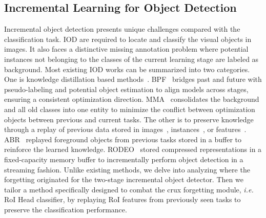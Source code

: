 \subsection{Incremental Learning for Object Detection}
Incremental object detection presents unique challenges compared with the classification task. 
IOD are required to locate and classify the visual objects in images. 
It also faces a distinctive missing annotation problem where potential instances not belonging to the classes of the current learning stage are labeled as background. 
Most existing IOD works can be summarized into two categories. 
One is knowledge distillation based methods~\cite{mo2024bridge, cermelli2022modeling}. BPF~\cite{mo2024bridge} bridges past and future with pseudo-labeling and potential object estimation to align models across stages, ensuring a consistent optimization direction. 
MMA~\cite{cermelli2022modeling} consolidates the background and all old classes into one entity to minimize the conflict between optimization objects between previous and current tasks. 
The other is to preserve knowledge through a replay of previous data stored in images~\cite{cldetr}, instances~\cite{yuyang2023augmented}, or features~\cite{acharya2020rodeo}. 
ABR~\cite{yuyang2023augmented} replayed foreground objects from previous tasks stored in a buffer to reinforce the learned knowledge.  RODEO~\cite{acharya2020rodeo} stored compressed representations in a fixed-capacity memory buffer to incrementally perform object detection in a streaming fashion.
Unlike existing methods, we delve into analyzing where the forgetting originated for the two-stage incremental object detector.
Then we tailor a method specifically designed to combat the crux forgetting module, \textit{i.e.} RoI Head classifier, by replaying RoI features from previously seen tasks to preserve the classification performance.